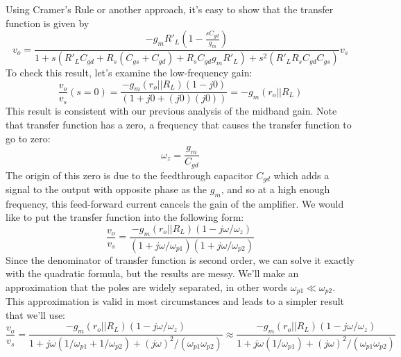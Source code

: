 Using Cramer's Rule or another approach, it's easy to show that the transfer function is given by
    \begin{equation}
        v_o = \frac{-g_m R'_L (1 - \frac{s C_{gd}}{g_m})}
        {1 + s \left( R'_L C_{gd} + R_s (C_{gs} + C_{gd}) + R_s C_{gd} g_m R'_L \right) 
        + s^2 (R'_L R_s C_{gd} C_{gs}) } v_s
        \label{eq:exact_transfer}
    \end{equation}
To check this result, let's examine the low-frequency gain:
    \begin{equation}
        \frac{{{v_{o}}}}{{{v_{s}}}}(s = 0) = \frac{{ - {g_m}\left( {{r_o}||{R_L}} \right)\left( {1 - j0} \right)}}{{\left( {1 + j0 + (j0)(j0)} \right) }} =  - {g_m}\left( {{r_o}||{R_L}} \right)
    \end{equation}
This result is consistent with our previous analysis of the midband gain.  Note that transfer function has a zero, a frequency that causes the transfer function to go to zero:
    \begin{equation} 
        {\omega_z} = \frac{g_m}{C_{gd}}
    \end{equation}
The origin of this zero is due to the feedthrough capacitor $C_{gd}$ which adds a signal to the output with opposite phase as the $g_m$, and so at a high enough frequency, this feed-forward current cancels the gain of the amplifier.
We would like to put the transfer function into the following form:
    \begin{equation}
        \frac{v_{o}}{v_{s}} = 
            \frac{ - g_m \left( r_o||R_L \right) \left( 1 - j\omega /\omega_z \right)}
            {\left( 1 + j\omega /\omega_{p1} \right) \left( 1 + j\omega /\omega_{p2} \right) }
    \end{equation}
Since the denominator of transfer function is second order, we can solve it exactly with the quadratic formula, but the results are messy.  We'll make an approximation that the poles are widely separated, in other words $\omega_{p1} \ll \omega_{p2}$.  This approximation is valid in most circumstances and leads to a simpler result that we'll use:
    \begin{equation}
        \frac{v_{o}}{v_{s}} = 
        \frac{ - g_m \left( r_o||R_L \right) \left( 1 - j\omega /\omega_z \right)}
        {1 + j\omega \left( 1/\omega_{p1} + 1/\omega_{p2} \right) + (j\omega)^2 / (\omega_{p1}\omega_{p2})}
        \approx 
        \frac{ - g_m \left( r_o||R_L \right) \left( 1 - j\omega /\omega_z \right)}
        { 1 + j\omega \left( 1/\omega_{p1}  \right) + (j\omega)^2 / (\omega_{p1}\omega_{p2})   }
    \end{equation}
